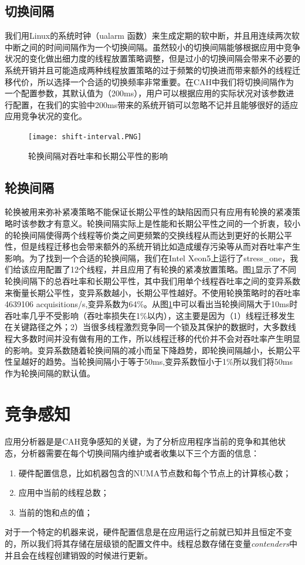 \subsection{切换间隔}
我们用Linux的系统时钟（ualarm 函数）来生成定期的软中断，并且用连续两次软中断之间的时间间隔作为一个切换间隔。虽然较小的切换间隔能够根据应用中竞争状况的变化做出细力度的线程放置策略调整，但是过小的切换间隔会带来不必要的系统开销并且可能造成两种线程放置策略的过于频繁的切换进而带来额外的线程迁移代价，所以选择一个合适的切换频率非常重要。在CAH中我们将切换间隔作为一个配置参数，其默认值为（200ms），用户可以根据应用的实际状况对该参数进行配置，在我们的实验中200ms带来的系统开销可以忽略不记并且能够很好的适应应用竞争状况的变化。

\begin{figure}[t]
	\centering
	\texttt{[image: shift-interval.PNG]}
	\caption{轮换间隔对吞吐率和长期公平性的影响}
	\label{Fig:shift-interval}
\end{figure}

\subsection{轮换间隔}
轮换被用来弥补紧凑策略不能保证长期公平性的缺陷因而只有应用有轮换的紧凑策略时该参数才有意义。轮换间隔实际上是性能和长期公平性之间的一个折衷，较小的轮换间隔使得两个线程等价类之间更频繁的交换线程从而达到更好的长期公平性，但是线程迁移也会带来额外的系统开销比如造成缓存污染等从而对吞吐率产生影响。为了找到一个合适的轮换间隔，我们在Intel Xeon5上运行了stress\_one，我们给该应用配置了12个线程，并且应用了有轮换的紧凑放置策略。图\ref{Fig:shift-interval}显示了不同轮换间隔下的总吞吐率和长期公平性，其中我们用单个线程吞吐率之间的变异系数来衡量长期公平性，变异系数越小，长期公平性越好。不使用轮换策略时的吞吐率4639106 acquisitions/s,变异系数为64\%。从图\ref{Fig:shift-interval}中可以看出当轮换间隔大于10ms时吞吐率几乎不受影响（吞吐率损失在1\%以内），这主要是因为（1）线程迁移发生在关键路径之外；2）当很多线程激烈竞争同一个锁及其保护的数据时，大多数线程大多数时间并没有做有用的工作，所以线程迁移的代价并不会对吞吐率产生明显的影响。变异系数随着轮换间隔的减小而呈下降趋势，即轮换间隔越小，长期公平性呈越好的趋势。当轮换间隔小于等于50ms,变异系数恒小于1\%所以我们将50ms作为轮换间隔的默认值。

\section{竞争感知}
应用分析器是是CAH竞争感知的关键，为了分析应用程序当前的竞争和其他状态，分析器需要在每个切换间隔内维护或者收集以下三个方面的信息：
\begin{enumerate}
  \item 硬件配置信息，比如机器包含的NUMA节点数和每个节点上的计算核心数；
  \item 应用中当前的线程总数；
  \item 当前的饱和点的值；
\end{enumerate}
对于一个特定的机器来说，硬件配置信息是在应用运行之前就已知并且恒定不变的，所以我们将其存储在层级锁的配置文件中。线程总数存储在变量\emph{contenders}中并且会在线程创建销毁的时候进行更新。

